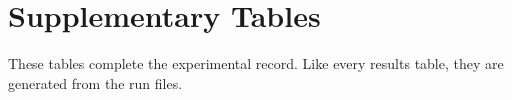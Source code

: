 \chapter{Supplementary Tables}\label{app:supp}

These tables complete the experimental record. Like every results table, they are generated from the run files.



